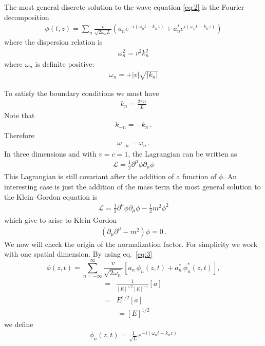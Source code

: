 The most general discrete solution to the wave equation  \eqref{eq:2} is the Fourier decomposition
\begin{align}
  \label{eq:3}
  \phi(t,z)=\sum_{n}\frac{v}{\sqrt{2\omega_{n} L}}
  \left(a_{n} e^{-i (\omega_n t-k_nz) }+a_{n}^* e^{i (\omega_n t-k_n z) }\right)
\end{align}
where the dispersion relation is
\begin{align}
\label{eq:4}
  \omega_n^2=v^2 k_n^2
\end{align}
where $\omega_n$ is definite positive:
\begin{align}
  \omega_n=+|v|\sqrt{|k_n|}
\end{align}

To satisfy the boundary conditions we must have
\begin{align}
  \label{eq:5}
  k_n=\frac{2\pi n}{L}
\end{align}
Note that
\begin{align}
  k_{-n}=-k_n\,.
\end{align}
Therefore
\begin{align}
  \omega_{-n}=\omega_n\,.
\end{align}
In three dimensions and with $v=c=1$, the Lagrangian can be written as
\begin{align}
\mathcal{L}=  \tfrac{1}{2}\partial^\mu\phi\partial_\mu\phi
\end{align}
This Lagrangian is still covariant after the addition of a function of $\phi$. An interesting case is just the addition of the mass term
the most general solution to the Klein--Gordon equation is 
\begin{align}
\mathcal{L}=  \tfrac{1}{2}\partial^\mu\phi\partial_\mu\phi-\tfrac{1}{2}m^2\phi^2
\end{align}
which give to arise to Klein-Gordon 
\begin{align}
  \left(\partial_\mu\partial^\mu-m^2\right)\phi=0\,.
\end{align}
We now will check the origin of the normalization factor. For simplicity we work with one spatial dimension. By using eq.~\eqref{eq:3}
\begin{equation}
\label{eq:6}
   \phi(z,t)=\sum_{n=-\infty}^\infty 
    \frac{v}{\sqrt{2\omega_n}}
  \left[a_n\,\phi_n(z,t)+a_n^*\,\phi_n^*(z,t)\right],
\end{equation}
\begin{align}
  [E]=&\frac{1}{[E]^{1/2}[E]^{-1}}[a]\nonumber\\
  =&E^{1/2}[a]
\end{align}
\begin{align}
  [a]=[E]^{1/2}
\end{align}
we define
\begin{align}
  \phi_n(z,t)=\frac{1}{\sqrt{L}}e^{-i(\omega_n t-k_n z)}
\end{align}

